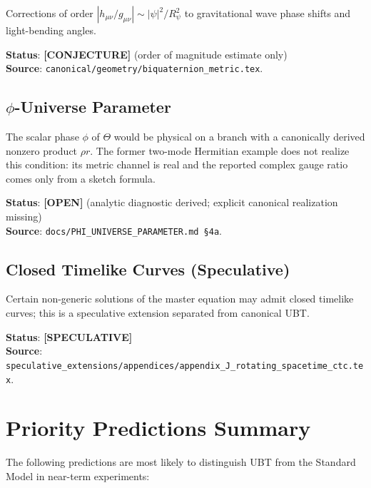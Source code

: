 \documentclass[11pt,a4paper]{article}
\theoremstyle{definition}
\theoremstyle{remark}
\begin{document}
Corrections of order $|h_{\mu\nu}/g_{\mu\nu}| \sim |\psi|^2/R_\psi^2$ to
gravitational wave phase shifts and light-bending angles.

\noindent\textbf{Status}: \textbf{[CONJECTURE]} (order of magnitude estimate only) \\
\noindent\textbf{Source}: \texttt{canonical/geometry/biquaternion\_metric.tex}.

\subsection{$\phi$-Universe Parameter}

The scalar phase $\phi$ of $\Theta$ would be physical on a branch with a
canonically derived nonzero product $\rho r$.  The former two-mode Hermitian
example does not realize this condition: its metric channel is real and the
reported complex gauge ratio comes only from a sketch formula.

\noindent\textbf{Status}: \textbf{[OPEN]} (analytic diagnostic derived; explicit canonical realization missing) \\
\noindent\textbf{Source}: \texttt{docs/PHI\_UNIVERSE\_PARAMETER.md \S4a}.

\subsection{Closed Timelike Curves (Speculative)}

Certain non-generic solutions of the master equation may admit closed timelike
curves; this is a speculative extension separated from canonical UBT.

\noindent\textbf{Status}: \textbf{[SPECULATIVE]} \\
\noindent\textbf{Source}: \texttt{speculative\_extensions/appendices/appendix\_J\_rotating\_spacetime\_ctc.tex}.

\section{Priority Predictions Summary}\label{sec:priority}

The following predictions are most likely to distinguish UBT from the
Standard Model in near-term experiments:
\end{document}
